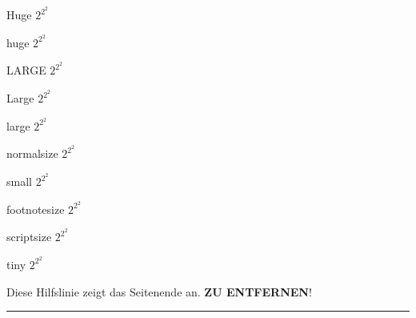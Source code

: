 \documentclass[serifmath,a0paper,noDIN,MathematikA0]{tudmathposter}
\begin{document}

\Huge Huge $2^{2^2}$

\huge huge $2^{2^2}$

\LARGE LARGE  $2^{2^2}$

\Large Large $2^{2^2}$

\large large $2^{2^2}$

\normalsize normalsize $2^{2^2}$

\small small $2^{2^2}$

\footnotesize footnotesize $2^{2^2}$

\scriptsize scriptsize $2^{2^2}$

\tiny tiny $2^{2^2}$

\vfill
Diese Hilfslinie zeigt das Seitenende an. \textbf{ZU ENTFERNEN}!
\hrule
\end{document}
